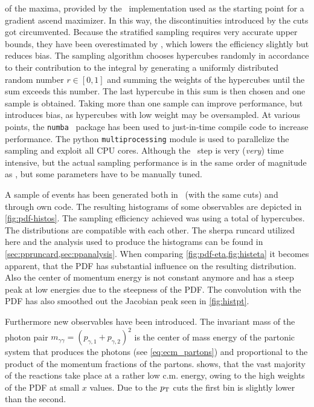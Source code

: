 of the maxima, provided by the \vegas\ implementation used as the
starting point for a gradient ascend maximizer. In this way, the
discontinuities introduced by the cuts got circumvented. Because the
stratified sampling requires very accurate upper bounds, they have
been overestimated by \!, which
lowers the efficiency slightly but reduces bias. The sampling
algorithm chooses hypercubes randomly in accordance to their
contribution to the integral by generating a uniformly distributed
random number \(r\in [0,1]\) and summing the weights of the hypercubes
until the sum exceeds this number. The last hypercube in this sum is
then chosen and one sample is obtained. Taking more than one sample
can improve performance, but introduces bias, as hypercubes with low
weight may be oversampled. At various points, the
\texttt{numba}~\cite{lam2015:po} package has been used to just-in-time
compile code to increase performance. The python
\texttt{multiprocessing} module is used to parallelize the sampling
and exploit all CPU cores. Although the \vegas\ step is very
(\emph{very}) time intensive, but the actual sampling performance is
in the same order of magnitude as \sherpa, but some parameters have to
be manually tuned.

A sample of  events has been
generated both in \sherpa\ (with the same cuts) and through own
code. The resulting histograms of some observables are depicted in
\cref{fig:pdf-histos}. The sampling efficiency achieved was
 using a total of
 hypercubes. The distributions
are compatible with each other. The sherpa runcard utilized here and
the analysis used to produce the histograms can be found in
\cref{sec:ppruncard,sec:ppanalysis}. When comparing
\cref{fig:pdf-eta,fig:histeta} it becomes apparent, that the PDF has
substantial influence on the resulting distribution. Also the center
of momentum energy is not constant anymore and has a steep peak at low
energies due to the steepness of the PDF. The convolution with the PDF
has also smoothed out the Jacobian peak seen in \cref{fig:histpt}.

Furthermore new observables have been introduced.  The invariant mass
of the photon pair
\(m_{\gamma\gamma} = (p_{\gamma,1} + p_{\gamma,2})^2\) is the center
of mass energy of the partonic system that produces the photons (see
\cref{eq:ecm_partons}) and proportional to the product of the momentum
fractions of the partons.  shows, that the vast
majority of the reactions take place at a rather low c.m. energy,
owing to the high weights of the PDF at small \(x\) values. Due to the
\(p_\mathrm{T}\) cuts the first bin is slightly lower than the second.

